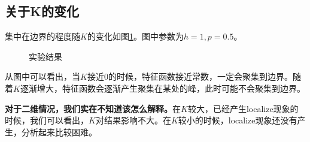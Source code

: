 \documentclass[12pt,a4paper]{article}
\begin{document}

\subsection{关于K的变化}

集中在边界的程度随$K$的变化如图\ref{fk1}。图中参数为$h=1, p=0.5$。
\begin{figure}[h]
\centering
{}
\caption{实验结果}
\label{fk1}
\end{figure}

从图中可以看出，当$K$接近0的时候，特征函数接近常数，一定会聚集到边界。随着$K$逐渐增大，特征函数会逐渐产生聚集在某处的峰，此时可能不会聚集到边界。

\textbf{\color{blue} 对于二维情况，我们实在不知道该怎么解释。}在$K$较大，已经产生localize现象的时候，我们可以看出，$K$对结果影响不大。在$K$较小的时候，localize现象还没有产生，分析起来比较困难。
\end{document}
